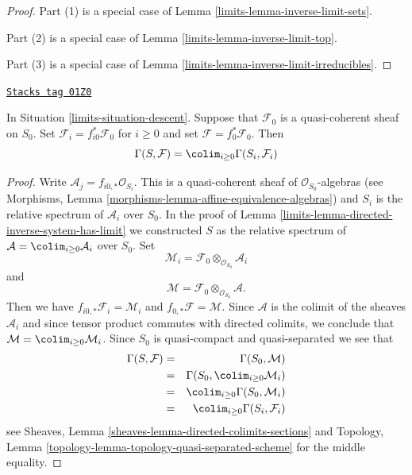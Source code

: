 \begin{proof}

Part (1) is a special case of Lemma \ref{limits-lemma-inverse-limit-sets}.

\medskip\noindent
Part (2) is a special case of Lemma \ref{limits-lemma-inverse-limit-top}.

\medskip\noindent
Part (3) is a special case of Lemma \ref{limits-lemma-inverse-limit-irreducibles}.
\end{proof}

\begin{lemma}
\label{limits-lemma-descend-section}
\href{https://stacks.math.columbia.edu/tag/01Z0}{\texttt{Stacks tag 01Z0}}

In Situation \ref{limits-situation-descent}.
Suppose that $\mathcal{F}_0$ is a quasi-coherent sheaf on $S_0$.
Set $\mathcal{F}_i = f_{i0}^*\mathcal{F}_0$ for $i \geq 0$ and set
$\mathcal{F} = f_0^*\mathcal{F}_0$.
Then
$$
\Gamma(S, \mathcal{F}) = \colim_{i \geq 0} \Gamma(S_i, \mathcal{F}_i)
$$
\end{lemma}

\begin{proof}

Write $\mathcal{A}_j = f_{i0, *} \mathcal{O}_{S_i}$.
This is a quasi-coherent sheaf of $\mathcal{O}_{S_0}$-algebras
(see Morphisms, Lemma \ref{morphisms-lemma-affine-equivalence-algebras})
and $S_i$ is the relative spectrum of $\mathcal{A}_i$ over $S_0$.
In the proof of Lemma \ref{limits-lemma-directed-inverse-system-has-limit}
we constructed $S$ as the relative spectrum of
$\mathcal{A} = \colim_{i \geq 0} \mathcal{A}_i$
over $S_0$. Set
$$
\mathcal{M}_i = \mathcal{F}_0 \otimes_{\mathcal{O}_{S_0}} \mathcal{A}_i
$$
and
$$
\mathcal{M} = \mathcal{F}_0 \otimes_{\mathcal{O}_{S_0}} \mathcal{A}.
$$
Then we have $f_{i0, *} \mathcal{F}_i = \mathcal{M}_i$
and $f_{0, *}\mathcal{F} = \mathcal{M}$. Since $\mathcal{A}$
is the colimit of the sheaves $\mathcal{A}_i$ and since tensor
product commutes with directed colimits, we conclude that
$\mathcal{M} = \colim_{i \geq 0} \mathcal{M}_i$.
Since $S_0$ is quasi-compact and quasi-separated we see that
\begin{eqnarray*}
\Gamma(S, \mathcal{F})
& = &
\Gamma(S_0, \mathcal{M}) \\
& = &
\Gamma(S_0, \colim_{i \geq 0} \mathcal{M}_i) \\
& = &
\colim_{i \geq 0} \Gamma(S_0, \mathcal{M}_i) \\
& = &
\colim_{i \geq 0} \Gamma(S_i, \mathcal{F}_i)
\end{eqnarray*}
see Sheaves, Lemma \ref{sheaves-lemma-directed-colimits-sections} and
Topology, Lemma \ref{topology-lemma-topology-quasi-separated-scheme}
for the middle equality.
\end{proof}

